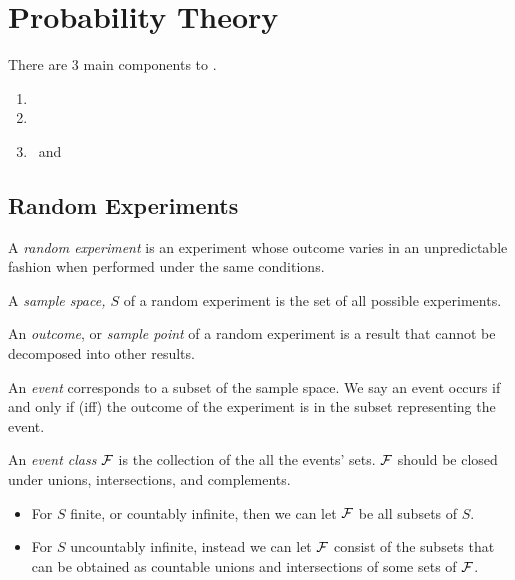 \section{Probability Theory} \label{sec:Probability Theory}
There are 3 main components to .
\begin{enumerate}
	\item {}
	\item {}
	\item {}~and~
\end{enumerate}

	\subsection{Random Experiments} \label{subsec:Random Experiments}
	\begin{definition} \label{def:Random Experiment}
		A \emph{random experiment} is an experiment whose outcome varies in an unpredictable fashion when performed under the same conditions.
	\end{definition}
	\begin{definition} \label{def:Sample Space}
		A \emph{sample space, $S$} of a random experiment is the set of all possible experiments.
	\end{definition}
	\begin{definition} \label{def:Outcome}
		An \emph{outcome}, or \emph{sample point} of a random experiment is a result that cannot be decomposed into other results.
	\end{definition}
	\begin{definition}[Event] \label{def:Event}
		An \emph{event} corresponds to a subset of the sample space. We say an event occurs if and only if (iff) the outcome of the experiment is in the subset representing the event.
	\end{definition}
	\begin{definition} \label{def:Event Classes}
		An \emph{event class} $\operatorname{\mathcal{F}}$ is the collection of the all the events' sets. $\operatorname{\mathcal{F}}$ should be closed under unions, intersections, and complements.
		\begin{itemize}[noitemsep, nolistsep]
			\item For $S$ finite, or countably infinite, then we can let $\operatorname{\mathcal{F}}$ be all subsets of $S$.
			\item For $S$ uncountably infinite, instead we can let $\operatorname{\mathcal{F}}$ consist of the subsets that can be obtained as countable unions and intersections of some sets of $\operatorname{\mathcal{F}}$.
		\end{itemize}
	\end{definition}
